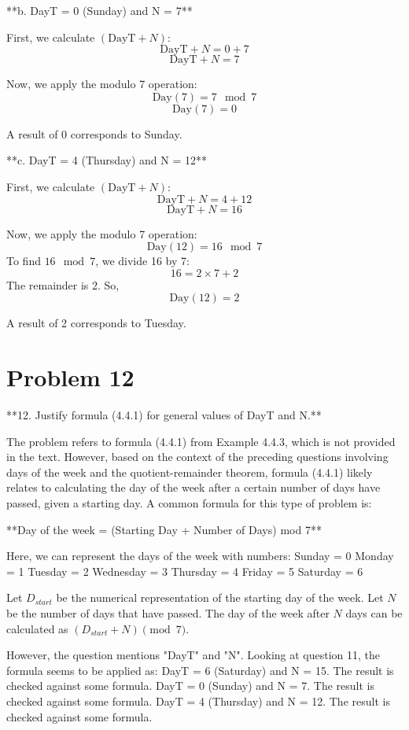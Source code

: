 \documentclass{article}
\begin{document}
**b. DayT = 0 (Sunday) and N = 7**

First, we calculate $(\text{DayT} + N)$:
$$ \text{DayT} + N = 0 + 7 $$
$$ \text{DayT} + N = 7 $$

Now, we apply the modulo 7 operation:
$$ \text{Day}(7) = 7 \mod 7 $$
$$ \text{Day}(7) = 0 $$

A result of 0 corresponds to Sunday.

**c. DayT = 4 (Thursday) and N = 12**

First, we calculate $(\text{DayT} + N)$:
$$ \text{DayT} + N = 4 + 12 $$
$$ \text{DayT} + N = 16 $$

Now, we apply the modulo 7 operation:
$$ \text{Day}(12) = 16 \mod 7 $$
To find $16 \mod 7$, we divide 16 by 7:
$$ 16 = 2 \times 7 + 2 $$
The remainder is 2. So,
$$ \text{Day}(12) = 2 $$

A result of 2 corresponds to Tuesday.

\newpage

\section*{Problem 12}
**12. Justify formula (4.4.1) for general values of DayT and N.**

The problem refers to formula (4.4.1) from Example 4.4.3, which is not provided in the text. However, based on the context of the preceding questions involving days of the week and the quotient-remainder theorem, formula (4.4.1) likely relates to calculating the day of the week after a certain number of days have passed, given a starting day. A common formula for this type of problem is:

**Day of the week = (Starting Day + Number of Days) mod 7**

Here, we can represent the days of the week with numbers:
Sunday = 0
Monday = 1
Tuesday = 2
Wednesday = 3
Thursday = 4
Friday = 5
Saturday = 6

Let $D_{start}$ be the numerical representation of the starting day of the week.
Let $N$ be the number of days that have passed.
The day of the week after $N$ days can be calculated as $(D_{start} + N) \pmod{7}$.

However, the question mentions "DayT" and "N". Looking at question 11, the formula seems to be applied as:
DayT = 6 (Saturday) and N = 15. The result is checked against some formula.
DayT = 0 (Sunday) and N = 7. The result is checked against some formula.
DayT = 4 (Thursday) and N = 12. The result is checked against some formula.
\end{document}
